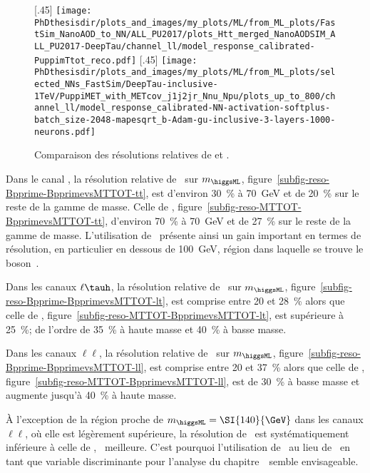 \begin{figure}[p]
[.45\textwidth]
{\texttt{[image: \\PhDthesisdir/plots\_and\_images/my\_plots/ML/from\_ML\_plots/FastSim\_NanoAOD\_to\_NN/ALL\_PU2017/plots\_Htt\_merged\_NanoAODSIM\_ALL\_PU2017-DeepTau/channel\_ll/model\_response\_calibrated-PuppimTtot\_reco.pdf]}\vspace{-.5\baselineskip}}
\hfill
{}[.45\textwidth]
{\texttt{[image: \\PhDthesisdir/plots\_and\_images/my\_plots/ML/from\_ML\_plots/selected\_NNs\_FastSim/DeepTau-inclusive-1TeV/PuppiMET\_with\_METcov\_j1j2jr\_Nnu\_Npu/plots\_up\_to\_800/channel\_ll/model\_response\_calibrated-NN-activation-softplus-batch\_size-2048-mapesqrt\_b-Adam-gu-inclusive-3-layers-1000-neurons.pdf]}\vspace{-.5\baselineskip}}

\caption{Comparaison des résolutions relatives de \mml et \mTtot.}
\label{fig-BpprimevsMTTOT-reso}
\end{figure}
\par
Dans le canal \tauh\tauh,
la résolution relative de \mml\ sur $m_{\higgsML}$,
figure~\ref{subfig-reso-Bpprime-BpprimevsMTTOT-tt},
est
d'environ \SI{30}{\%} à \SI{70}{\GeV}
et de \SI{20}{\%} sur le reste de la gamme de masse.
Celle de \mTtot,
figure~\ref{subfig-reso-MTTOT-BpprimevsMTTOT-tt},
d'environ \SI{70}{\%} à \SI{70}{\GeV}
et de \SI{27}{\%} sur le reste de la gamme de masse.
L'utilisation de \mml\ présente ainsi un gain important en termes de résolution,
en particulier en dessous de \SI{100}{\GeV}, région dans laquelle se trouve le boson~\Zboson.
\par
Dans les canaux $\ell\tauh$,
la résolution relative de \mml\ sur $m_{\higgsML}$,
figure~\ref{subfig-reso-Bpprime-BpprimevsMTTOT-lt},
est
comprise entre \num{20} et \SI{28}{\%}
alors que
celle de \mTtot,
figure~\ref{subfig-reso-MTTOT-BpprimevsMTTOT-lt},
est supérieure à \SI{25}{\%};
de l'ordre de \SI{35}{\%} à haute masse et
\SI{40}{\%} à basse masse.
\par
Dans les canaux $\ell\ell$,
la résolution relative de \mml\ sur $m_{\higgsML}$,
figure~\ref{subfig-reso-Bpprime-BpprimevsMTTOT-ll},
est
comprise entre \num{20} et \SI{37}{\%}
alors que
celle de \mTtot,
figure~\ref{subfig-reso-MTTOT-BpprimevsMTTOT-ll},
est de \SI{30}{\%} à basse masse et augmente
jusqu'à \SI{40}{\%} à haute masse.
\par
À l'exception de la région proche de $m_{\higgsML}=\SI{140}{\GeV}$ dans les canaux $\ell\ell$,
où elle est légèrement supérieure,
la résolution de \mml\ est systématiquement inférieure à celle de \mTtot, \ie\ meilleure.
C'est pourquoi l'utilisation de \mml\ au lieu de \mTtot\ en tant que variable discriminante pour l'analyse du chapitre~\ semble envisageable.
